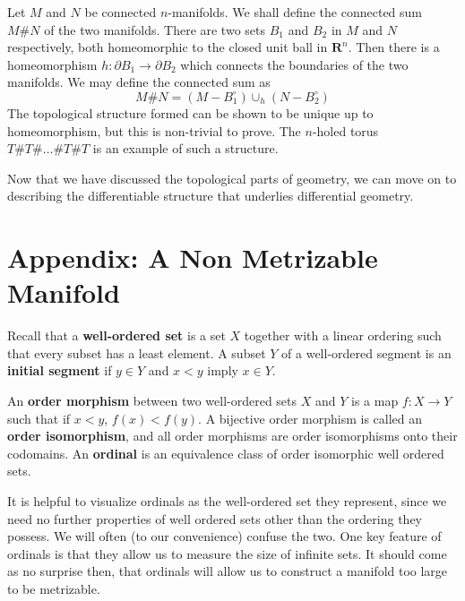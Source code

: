\begin{example}
    Let $M$ and $N$ be connected $n$-manifolds. We shall define the connected sum $M \# N$ of the two manifolds. There are two sets $B_1$ and $B_2$ in $M$ and $N$ respectively, both homeomorphic to the closed unit ball in $\mathbf{R}^n$. Then there is a homeomorphism $h:\partial B_1 \to \partial B_2$ which connects the boundaries of the two manifolds. We may define the connected sum as
    \[ M \# N = (M - B_1^\circ) \cup_h (N - B_2^\circ) \]
    The topological structure formed can be shown to be unique up to homeomorphism, but this is non-trivial to prove. The $n$-holed torus $T \# T \# \dots \# T \# T$ is an example of such a structure.
\end{example}

Now that we have discussed the topological parts of geometry, we can move on to describing the differentiable structure that underlies differential geometry.

\newpage

\section{Appendix: A Non Metrizable Manifold}

Recall that a {\bf well-ordered set} is a set $X$ together with a linear ordering such that every subset has a least element. A subset $Y$ of a well-ordered segment is an {\bf initial segment} if $y \in Y$ and $x < y$ imply $x \in Y$.

\begin{definition}
    An {\bf order morphism} between two well-ordered sets $X$ and $Y$ is a map $f:X \to Y$ such that if $x < y$, $f(x) < f(y)$. A bijective order morphism is called an {\bf order isomorphism}, and all order morphisms are order isomorphisms onto their codomains. An {\bf ordinal} is an equivalence class of order isomorphic well ordered sets.
\end{definition}

It is helpful to visualize ordinals as the well-ordered set they represent, since we need no further properties of well ordered sets other than the ordering they possess. We will often (to our convenience) confuse the two. One key feature of ordinals is that they allow us to measure the size of infinite sets. It should come as no surprise then, that ordinals will allow us to construct a manifold too large to be metrizable.

